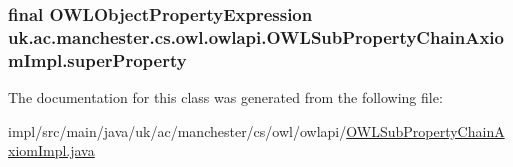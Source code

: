 \hypertarget{classuk_1_1ac_1_1manchester_1_1cs_1_1owl_1_1owlapi_1_1_o_w_l_sub_property_chain_axiom_impl_a177b627a8ebbddd97ed06d369bf69bff}{
\subsubsection[{super\-Property}]{\setlength{\rightskip}{0pt plus 5cm}final {\bf O\-W\-L\-Object\-Property\-Expression} uk.\-ac.\-manchester.\-cs.\-owl.\-owlapi.\-O\-W\-L\-Sub\-Property\-Chain\-Axiom\-Impl.\-super\-Property\hspace{0.3cm}{\ttfamily [private]}}}\label{classuk_1_1ac_1_1manchester_1_1cs_1_1owl_1_1owlapi_1_1_o_w_l_sub_property_chain_axiom_impl_a177b627a8ebbddd97ed06d369bf69bff}


The documentation for this class was generated from the following file\-:\begin{DoxyCompactItemize}
\item 
impl/src/main/java/uk/ac/manchester/cs/owl/owlapi/\hyperlink{_o_w_l_sub_property_chain_axiom_impl_8java}{O\-W\-L\-Sub\-Property\-Chain\-Axiom\-Impl.\-java}\end{DoxyCompactItemize}
